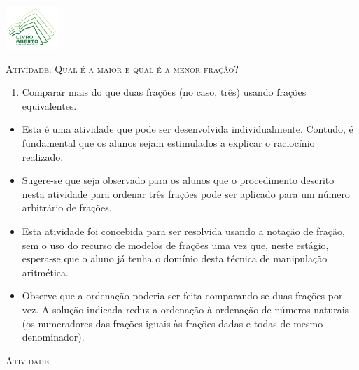 \documentclass[10 pt,usenames,dvipsnames, oneside]{article}
\begin{document}
\begin{center}
  \begin{minipage}[l]{3cm}
\includegraphics[width=2cm]{../../../Figuras/logo}       
\end{minipage}\hfill
\begin{minipage}[r]{.8\textwidth}
 {\Large \scshape Atividade: Qual é a maior e qual é a menor fração?}  
\end{minipage}
\end{center}
\vspace{.2cm}

\ifdefined\prof
\begin{goals}
\begin{enumerate}
\item       Comparar mais do que duas frações (no caso, três) usando frações
equivalentes.
\end{enumerate}

\tcblower

\begin{itemize}
\item       Esta é uma atividade que pode ser desenvolvida individualmente.
Contudo, é fundamental que os alunos sejam estimulados a explicar o raciocínio
realizado.
\item       Sugere-se que seja observado para os alunos que o procedimento
descrito nesta atividade para ordenar três frações pode ser aplicado para um
número arbitrário de frações.
\item       Esta atividade foi concebida para ser resolvida usando a notação
de fração, sem o uso do recurso de modelos de frações uma vez que, neste
estágio, espera-se que o aluno já tenha o domínio desta técnica de manipulação
aritmética.
\item       Observe que a ordenação poderia ser feita comparando-se duas
frações por vez. A solução indicada reduz a ordenação à ordenação de números
naturais (os numeradores das frações iguais às frações dadas e todas de mesmo
denominador).
\end{itemize}
\end{goals}

\bigskip
\begin{center}
{\large \scshape Atividade}
\end{center}
\fi
\end{document}
